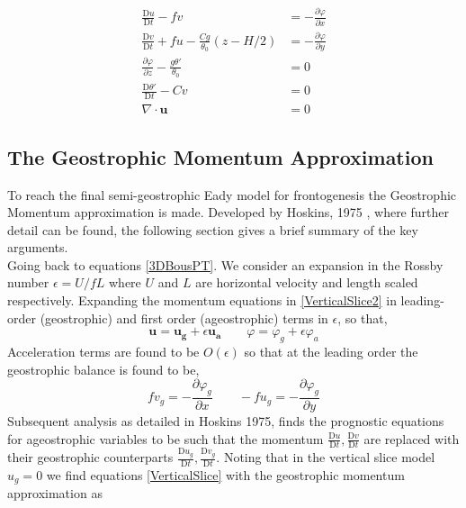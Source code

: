 \begin{equation}
	\begin{aligned}
	\frac{\mathrm{D}u}{\mathrm{D}t}	- fv  &= -\frac{\partial \varphi}{\partial x}
	\\
	\frac{\mathrm{D}v}{\mathrm{D}t}	+ fu - \frac{Cg}{\theta_0}\left(z - H/2\right) &= -\frac{\partial \varphi}{\partial y} 
	\\
	\frac{\partial \varphi}{\partial z} - \frac{g\theta'}{\theta_0} &= 0
	\\
	\frac{\mathrm{D}\theta'}{\mathrm{D} t}  - Cv &= 0
	\\
	\nabla \cdot \bm{u} &= 0
	\end{aligned} 
\label{VerticalSlice2}
\end{equation}
\subsection{The Geostrophic Momentum Approximation \label{Geostrophic}}
To reach the final semi-geostrophic Eady model for frontogenesis the Geostrophic Momentum approximation is made. Developed by Hoskins, 1975 \cite{Hoskins1975}, where further detail can be found, the following section gives a brief summary of the key arguments.\\
\linebreak
Going back to equations \ref{3DBousPT}. We consider an expansion in the Rossby number $\epsilon = U/fL$ where $U$ and $L$ are horizontal velocity and length scaled respectively. Expanding the momentum equations in \ref{VerticalSlice2} in leading-order (geostrophic) and first order (ageostrophic) terms in $\epsilon$, so that,
\begin{equation*}
	\bm{u} = \bm{u_g} + \epsilon \bm{u_a} \qquad \varphi = \varphi_g +\epsilon \varphi_a
\end{equation*}
Acceleration terms are found to be $O(\epsilon)$ so that at the leading order the geostrophic balance is found to be,
\begin{equation}
	fv_g  = -\frac{\partial \varphi_g}{\partial x} \qquad
	-fu_g  = -\frac{\partial \varphi_g}{\partial y}
\end{equation}
Subsequent analysis as detailed in Hoskins 1975, \cite{Hoskins1975} finds the prognostic equations for ageostrophic variables to be such that the momentum $\frac{\mathrm{D}u}{\mathrm{D}t}, \frac{\mathrm{D}v}{\mathrm{D}t}$ are replaced with their geostrophic counterparts $\frac{\mathrm{D}u_g}{\mathrm{D}t}, \frac{\mathrm{D}v_g}{\mathrm{D}t}$. Noting that in the vertical slice model $u_g = 0$ we find equations \ref{VerticalSlice} with the geostrophic momentum approximation as
